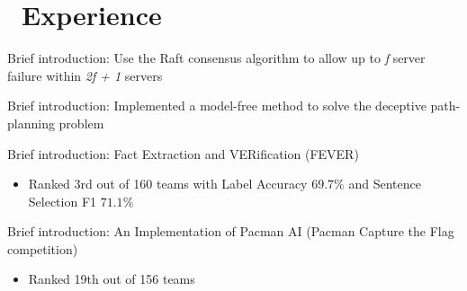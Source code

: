 \documentclass{resume}
\begin{document}
\section{\faUsers\ Experience}

Brief introduction: Use the Raft consensus algorithm to allow up to \textit{f} server failure within \textit{2f + 1} servers




Brief introduction: Implemented a model-free method to solve the deceptive path-planning problem


Brief introduction: Fact Extraction and VERification (FEVER)
\begin{itemize}
  \item Ranked 3rd out of 160 teams with Label Accuracy $69.7\%$ and Sentence Selection F1 $71.1\%$
\end{itemize}


Brief introduction: An Implementation of Pacman AI (Pacman Capture the Flag competition)
\begin{itemize}
  \item Ranked 19th out of 156 teams
\end{itemize}


\end{document}
